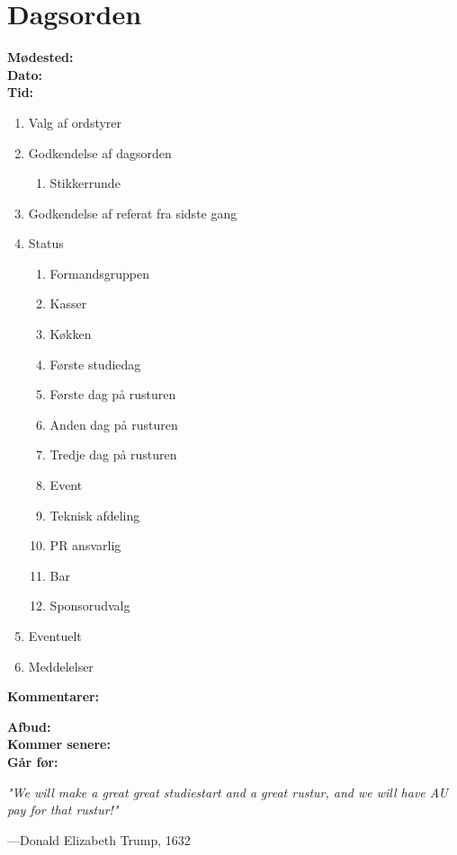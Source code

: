 




\section*{Dagsorden \meeting{}}
\textbf{Mødested:} \location{}\\
\textbf{Dato:} \dato{}\\
\textbf{Tid:} \tid{}

\begin{enumerate}
  \item Valg af ordstyrer
  \item Godkendelse af dagsorden
  \begin{enumerate}
    \item Stikkerrunde
  \end{enumerate}
  \item Godkendelse af referat fra sidste gang
  \item Status
  \begin{enumerate}
    \item Formandsgruppen
    \item Kasser
    \item Køkken
    \item Første studiedag
    \item Første dag på rusturen
    \item Anden dag på rusturen
    \item Tredje dag på rusturen
    \item Event
    \item Teknisk afdeling
    \item PR ansvarlig
    \item Bar
    \item Sponsorudvalg
  \end{enumerate}
  \item Eventuelt
  \item Meddelelser
\end{enumerate}

\textbf{Kommentarer: }\kommentarer{}

\textbf{Afbud: }\afbud{}\\
\textbf{Kommer senere: }\kommersenere{}\\
\textbf{Går før: }\gaafoer{}

\vspace{2em}
\begin{minipage}{0.55\textwidth}
  \color{gray}\footnotesize\textit{"We will make a great great studiestart and a great rustur, and we will have AU pay for that rustur!"}

  \raggedleft\----Donald Elizabeth Trump, 1632
\end{minipage}


